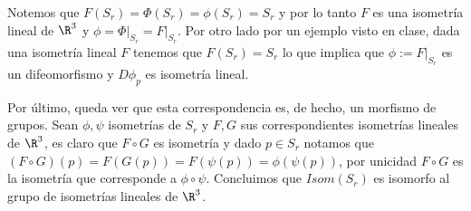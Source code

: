 \documentclass{article}
\begin{document}
\noindent Notemos que $F(S_{r})=\Phi(S_{r})=\phi(S_{r})=S_{r}$ y por lo tanto $F$ es una isometría 
lineal de $\R^{3}$ y $\phi=\Phi\big|_{S_{r}}=F\big|_{S_{r}}$. Por otro lado por un ejemplo visto 
en clase, dada una isometría lineal $F$ tenemos que $F(S_{r})=S_{r}$ lo que implica que
$\phi:=F\big|_{S_{r}}$ es un difeomorfismo y $D\phi_{p}$ es isometría lineal.

\vspace{2mm}
\noindent Por último, queda ver que esta correspondencia es, de hecho, un morfismo de grupos. Sean
$\phi,\psi$ isometrías de $S_{r}$ y $F,G$ sus correspondientes isometrías lineales de $\R^{3}$, es 
claro que $F\circ G$ es isometría y dado $p\in S_{r}$ notamos que $(F\circ G)(p)=F(G(p))=F(\psi(p))
=\phi(\psi(p))$, por unicidad $F\circ G$ es la isometría que corresponde a $\phi\circ\psi$. 
Concluimos que $Isom(S_{r})$ es isomorfo al grupo de isometrías lineales de $\R^{3}$.
\end{document}
